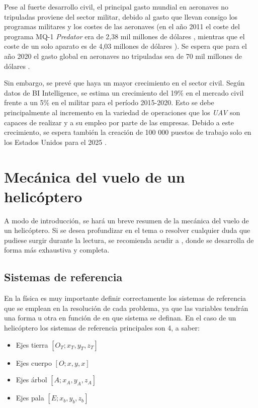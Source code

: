 Pese al fuerte desarrollo civil, el principal gasto mundial en aeronaves no tripuladas proviene del sector militar, debido al gasto que llevan consigo los programas militares y los costes de las aeronaves (en el año 2011 el coste del programa MQ-1 \emph{Predator} era de 2,38 mil millones de dólares \citep{Predatorunitbudget}, mientras que el coste de un solo aparato es de 4,03 millones de dólares \citep{Predatorprogrambudget}). Se espera que para el año 2020 el gasto global en aeronaves no tripuladas sea de 70 mil millones de dólares \citep{Goldman}.

Sin embargo, se prevé que haya un mayor crecimiento en el sector civil. Según datos de BI Intelligence, se estima un crecimiento del 19\% en el mercado civil frente a un 5\% en el militar para el período 2015-2020.
Esto se debe principalmente al incremento en la variedad de operaciones que los \emph{UAV} son capaces de realizar y a su empleo por parte de las empresas. Debido a este crecimiento, se espera también la creación de 100 000 puestos de trabajo solo en los Estados Unidos para el 2025 \citep{AUVSI}.

\section{Mecánica del vuelo de un helicóptero}
A modo de introducción, se hará un breve resumen de la mecánica del vuelo de un helicóptero. Si se desea profundizar en el tema o resolver cualquier duda que pudiese surgir durante la lectura, se recomienda acudir a \citet{Cuerva}, donde se desarrolla de forma más exhaustiva y completa.

\subsection{Sistemas de referencia}
En la física es muy importante definir correctamente los sistemas de referencia que se emplean en la resolución de cada problema, ya que las variables tendrán una forma u otra en función de en que sistema se definan.
En el caso de un helicóptero los sistemas de referencia principales son 4, a saber:
\begin{itemize}
	\item Ejes tierra $[O_{T};x_{T},y_{T},z_{T}]$
	\item Ejes cuerpo $[O;x,y,x]$
	\item Ejes árbol $[A;x_{A},y_{A},z_{A}]$
	\item Ejes pala $[E;x_{b},y_{b},z_{b}]$
\end{itemize}

